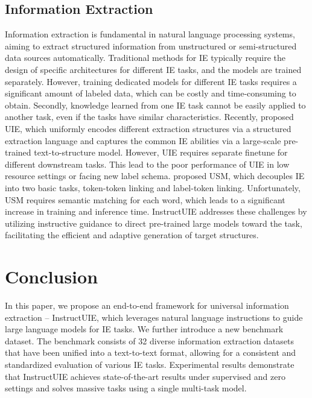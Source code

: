 \documentclass[11pt]{article}
\begin{document}
\subsection{Information Extraction}
Information extraction is fundamental in natural language processing systems, aiming to extract structured information from unstructured or semi-structured data sources automatically. 
Traditional methods \cite{wang-etal-2022-miner,yan-etal-2021-unified,CoNLL2004SOTA,NYT11HRLSOTA} for IE typically require the design of specific architectures for different IE tasks, and the models are trained separately. However, training dedicated models for different IE tasks requires a significant amount of labeled data, which can be costly and time-consuming to obtain. Secondly, knowledge learned from one IE task cannot be easily applied to another task, even if the tasks have similar characteristics. 
Recently, \citet{UIE} proposed UIE, which uniformly encodes different extraction structures via a structured extraction language and captures the common IE abilities via a large-scale pre-trained text-to-structure model. However, UIE requires separate finetune for different downstream tasks. This lead to the poor performance of UIE in low resource settings or facing new label schema. 
\citet{USM} proposed USM, which decouples IE into two basic tasks, token-token linking and label-token linking.  Unfortunately, USM requires semantic matching for each word, which leads to a significant increase in training and inference time.
InstructUIE addresses these challenges by utilizing instructive guidance to direct pre-trained large models toward the task, facilitating the efficient and adaptive generation of target structures.


\section{Conclusion}
In this paper, we propose an end-to-end framework for universal information extraction – InstructUIE, which leverages natural language instructions to guide large language models for IE tasks. 
We further introduce a new benchmark dataset. The benchmark consists of 32 diverse information extraction datasets that have been unified into a text-to-text format, allowing for a consistent and standardized evaluation of various IE tasks.
Experimental results demonstrate that InstructUIE achieves state-of-the-art results under supervised and zero settings and solves massive tasks using a single multi-task model. 
\end{document}
